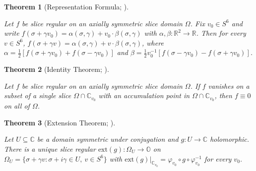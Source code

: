\documentclass[11pt]{article}
\newcommand{\OO}{\mathbb{O}}
\newcommand{\CC}{\mathbb{C}}
\newcommand{\RR}{\mathbb{R}}
\providecommand{\lean}[1]{}
\providecommand{\uses}[1]{}
\theoremstyle{plain}
\newtheorem{theorem}{Theorem}[section]
\theoremstyle{definition}
\theoremstyle{remark}
\begin{document}
\begin{theorem}[Representation Formula; {\cite[Thm.~5.1.7]{CSS12}}]\label{thm:rep-formula}
\uses{def:slice-regular}
Let $f$ be slice regular on an axially symmetric slice domain $\Omega$. Fix
$v_0\in S^6$ and write $f(\sigma+\gamma v_0)=\alpha(\sigma,\gamma)+v_0\cdot\beta(\sigma,\gamma)$
with $\alpha,\beta:\RR^2\to\RR$. Then for every $v\in S^6$,
$f(\sigma+\gamma v)=\alpha(\sigma,\gamma)+v\cdot\beta(\sigma,\gamma)$, where
$\alpha=\tfrac12[f(\sigma+\gamma v_0)+f(\sigma-\gamma v_0)]$ and
$\beta=\tfrac12 v_0^{-1}[f(\sigma-\gamma v_0)-f(\sigma+\gamma v_0)]$.
\end{theorem}

\begin{theorem}[Identity Theorem; {\cite[Cor.~5.1.9]{CSS12}}]\label{thm:identity}
\lean{stem_identity}
\uses{def:slice-regular}
Let $f$ be slice regular on an axially symmetric slice domain $\Omega$. If $f$
vanishes on a subset of a single slice $\Omega\cap\CC_{v_0}$ with an accumulation
point in $\Omega\cap\CC_{v_0}$, then $f\equiv0$ on all of $\Omega$.
\end{theorem}

\begin{theorem}[Extension Theorem; {\cite[Thm.~5.1.5]{CSS12}}]\label{thm:extension}
\uses{def:slice-regular}
Let $U\subseteq\CC$ be a domain symmetric under conjugation and $g:U\to\CC$
holomorphic. There is a unique slice regular $\mathrm{ext}(g):\Omega_U\to\OO$ on
$\Omega_U=\{\sigma+\gamma v:\sigma+i\gamma\in U,\ v\in S^6\}$ with
$\mathrm{ext}(g)|_{\CC_{v_0}}=\varphi_{v_0}\circ g\circ\varphi_{v_0}^{-1}$ for every
$v_0$.
\end{theorem}
\end{document}
